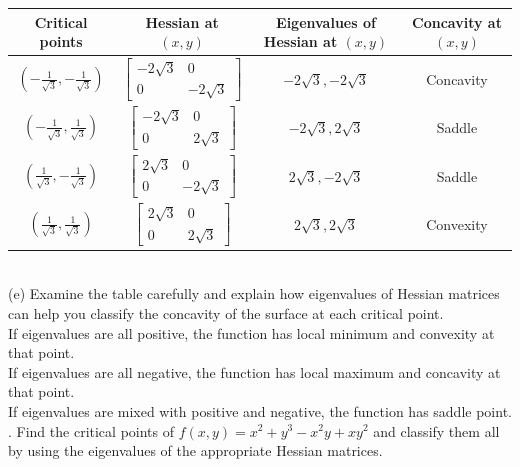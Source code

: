 \documentclass{article} %
\begin{document}
{    \begin{tabular}{|c|c|c|c|}
        \hline
        Critical points & Hessian at $ (x, y) $ & Eigenvalues of Hessian at $ (x, y) $ & Concavity at $ (x, y) $ \\
        \hline
        $ \left(-\frac{1}{\sqrt{3}}, -\frac{1}{\sqrt{3}}\right) $ & $\begin{bmatrix} -2\sqrt{3} & 0 \\ 0 & -2\sqrt{3} \end{bmatrix}$ & $-2\sqrt{3}, -2\sqrt{3}$ & Concavity \\
        \hline
        $ \left(-\frac{1}{\sqrt{3}}, \frac{1}{\sqrt{3}}\right) $ & $\begin{bmatrix} -2\sqrt{3} & 0 \\ 0 & 2\sqrt{3} \end{bmatrix}$ & $-2\sqrt{3}, 2\sqrt{3}$ & Saddle \\
        \hline
        $ \left(\frac{1}{\sqrt{3}}, -\frac{1}{\sqrt{3}}\right) $ & $\begin{bmatrix} 2\sqrt{3} & 0 \\ 0 & -2\sqrt{3} \end{bmatrix}$ & $2\sqrt{3}, -2\sqrt{3}$ & Saddle \\
        \hline
        $ \left(\frac{1}{\sqrt{3}}, \frac{1}{\sqrt{3}}\right) $ & $\begin{bmatrix} 2\sqrt{3} & 0 \\ 0 & 2\sqrt{3} \end{bmatrix}$ & $2\sqrt{3}, 2\sqrt{3}$ & Convexity \\
        \hline
    \end{tabular} \\

    \noindent (e) Examine the table carefully and explain how eigenvalues of Hessian matrices can help you classify
    the concavity of the surface at each critical point.\\

    If eigenvalues are all positive, the function has local minimum and convexity at that point. \\
    If eigenvalues are all negative, the function has local maximum and concavity at that point. \\
    If eigenvalues are mixed with positive and negative, the function has saddle point. \\

    . Find the critical points of $ f(x, y) = x^2 + y^3 - x^2y + xy^2 $ and classify them all by using the eigenvalues
    of the appropriate Hessian matrices. \\

}
\end{document}
